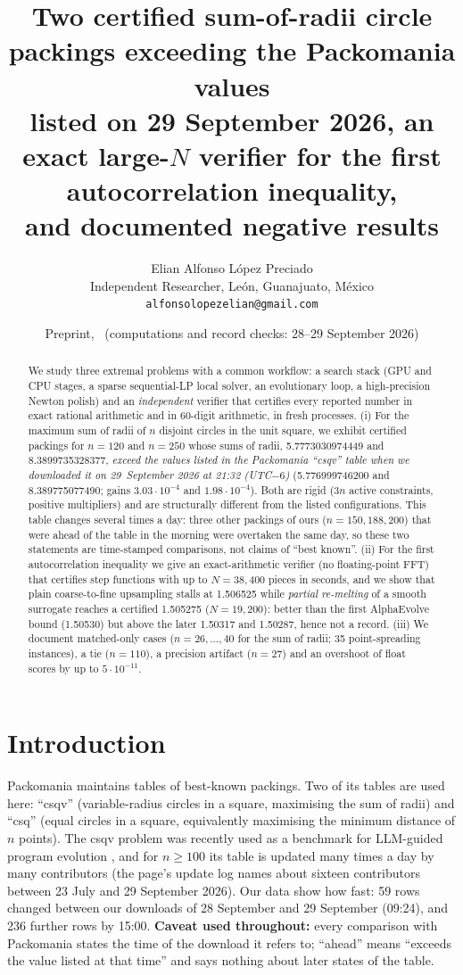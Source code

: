 \documentclass[10pt]{article}
\title{Two certified sum-of-radii circle packings exceeding the Packomania values\\ listed on 29 September 2026,
an exact large-$N$ verifier for the first autocorrelation inequality,\\ and documented negative results}
\author{Elian Alfonso L\'opez Preciado\\ Independent Researcher, Le\'on, Guanajuato, M\'exico\\
\texttt{alfonsolopezelian@gmail.com}}
\date{Preprint, \pubdate\ (computations and record checks: 28--29 September 2026)}
\begin{document}
\maketitle

\begin{abstract}
We study three extremal problems with a common workflow: a search stack (GPU and CPU stages, a sparse sequential-LP local solver, an
evolutionary loop, a high-precision Newton polish) and an \emph{independent} verifier that certifies every reported number in exact
rational arithmetic and in 60-digit arithmetic, in fresh processes.
(i) For the maximum sum of radii of $n$ disjoint circles in the unit square, we exhibit certified packings for $n=120$ and $n=250$
whose sums of radii, 5.7773030974449 and 8.3899735328377, \emph{exceed the values listed in the Packomania ``csqv'' table when we downloaded it on
29~September 2026 at 21:32 (UTC$-6$)} (5.776999746200 and 8.389775077490; gains $3.03\cdot10^{-4}$ and $1.98\cdot10^{-4}$). Both are rigid
($3n$ active constraints, positive multipliers) and are structurally different from the listed configurations. This table changes several times a day:
three other packings of ours ($n=150,188,200$) that were ahead of the table in the morning were overtaken the same day, so these two statements are
time-stamped comparisons, not claims of ``best known''.
(ii) For the first autocorrelation inequality we give an exact-arithmetic verifier (no floating-point FFT) that certifies step functions with up to
$N=38{,}400$ pieces in seconds, and we show that plain coarse-to-fine upsampling stalls at 1.506525 while \emph{partial re-melting} of a smooth surrogate
reaches a certified 1.505275 ($N=19{,}200$): better than the first AlphaEvolve bound (1.50530) but above the later 1.50317 and 1.50287, hence not a record.
(iii) We document matched-only cases ($n=26,\dots,40$ for the sum of radii; 35 point-spreading instances), a tie ($n=110$), a precision artifact ($n=27$) and an overshoot of float scores by up to $5\cdot10^{-11}$.
\end{abstract}

\section{Introduction}
Packomania \cite{packomania} maintains tables of best-known packings. Two of its tables are used here: ``csqv'' (variable-radius circles in a square,
maximising the sum of radii) and ``csq'' (equal circles in a square, equivalently maximising the minimum distance of $n$ points). The csqv problem
was recently used as a benchmark for LLM-guided program evolution \cite{alphaevolve,tttdiscover}, and for $n\ge100$ its table is updated
many times a day by many contributors (the page's update log names about sixteen contributors between 23 July and 29 September 2026). Our data show how fast:
59 rows changed between our downloads of 28 September and 29 September (09:24), and 236 further rows by 15:00.
\textbf{Caveat used throughout:} every comparison with Packomania states the time of the download it refers to; ``ahead'' means ``exceeds the value listed at that time'' and
says nothing about later states of the table.
\end{document}
